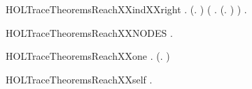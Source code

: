 \newcommand{\HOLTraceTheoremsReachXXind}{\UseVerbatim{HOLTraceTheoremsReachXXind}}
\begin{SaveVerbatim}{HOLTraceTheoremsReachXXindXXright}
\HOLTokenTurnstile{} \HOLSymConst{\HOLTokenForall{}}.
       (\HOLSymConst{\HOLTokenForall{}}.   ) \HOLSymConst{\HOLTokenConj{}} (\HOLSymConst{\HOLTokenForall{}}  .    \HOLSymConst{\HOLTokenConj{}} (\HOLSymConst{\HOLTokenExists{}}.  \HOLTokenTransBegin{}\HOLTokenTransEnd {}) \HOLSymConst{\HOLTokenImp{}}   ) \HOLSymConst{\HOLTokenImp{}}
       \HOLSymConst{\HOLTokenForall{}} .    \HOLSymConst{\HOLTokenImp{}}   
\end{SaveVerbatim}
\newcommand{\HOLTraceTheoremsReachXXindXXright}{\UseVerbatim{HOLTraceTheoremsReachXXindXXright}}
\begin{SaveVerbatim}{HOLTraceTheoremsReachXXNODES}
\HOLTokenTurnstile{} \HOLSymConst{\HOLTokenForall{}} .    \HOLSymConst{\HOLTokenImp{}}  \HOLConst{\HOLTokenIn{}}  
\end{SaveVerbatim}
\newcommand{\HOLTraceTheoremsReachXXNODES}{\UseVerbatim{HOLTraceTheoremsReachXXNODES}}
\begin{SaveVerbatim}{HOLTraceTheoremsReachXXone}
\HOLTokenTurnstile{} \HOLSymConst{\HOLTokenForall{}} . (\HOLSymConst{\HOLTokenExists{}}.  \HOLTokenTransBegin{}\HOLTokenTransEnd {}) \HOLSymConst{\HOLTokenImp{}}   
\end{SaveVerbatim}
\newcommand{\HOLTraceTheoremsReachXXone}{\UseVerbatim{HOLTraceTheoremsReachXXone}}
\begin{SaveVerbatim}{HOLTraceTheoremsReachXXself}
\HOLTokenTurnstile{} \HOLSymConst{\HOLTokenForall{}}.   
\end{SaveVerbatim}
\newcommand{\HOLTraceTheoremsReachXXself}{\UseVerbatim{HOLTraceTheoremsReachXXself}}
